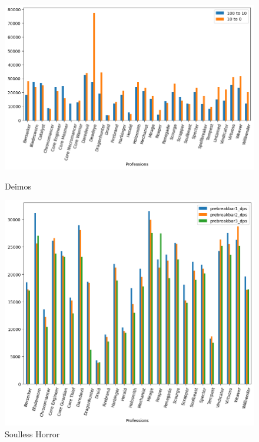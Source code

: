 \documentclass[12pt,a4paper]{article}
\begin{document}
    \begin{figure}[h!]
        
        \centering
        
        \includegraphics[width=0.8 \linewidth]{dei_dps_plot.png}
        \caption{Deimos}
        \includegraphics[width=0.9 \linewidth]{sh_dps_plot.png}
        \caption{Soulless Horror}
    \end{figure}

    \newpage
\end{document}
